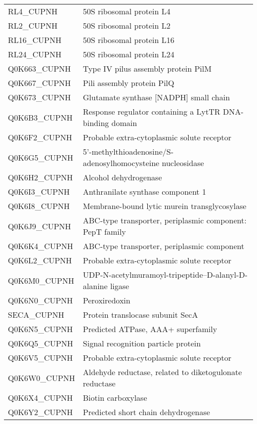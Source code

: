 \begin{center}
\begin{longtable}{ l l }
RL4\_CUPNH & 50S ribosomal protein L4 \\ [0.5ex]
RL2\_CUPNH & 50S ribosomal protein L2 \\ [0.5ex]
RL16\_CUPNH & 50S ribosomal protein L16 \\ [0.5ex]
RL24\_CUPNH & 50S ribosomal protein L24 \\ [0.5ex]
Q0K663\_CUPNH & Type IV pilus assembly protein PilM \\ [0.5ex]
Q0K667\_CUPNH & Pili assembly protein PilQ \\ [0.5ex]
Q0K673\_CUPNH & Glutamate synthase [NADPH] small chain \\ [0.5ex]
Q0K6B3\_CUPNH & Response regulator containing a LytTR DNA-binding domain \\ [0.5ex]
Q0K6F2\_CUPNH & Probable extra-cytoplasmic solute receptor \\ [0.5ex]
Q0K6G5\_CUPNH & 5'-methylthioadenosine/S-adenosylhomocysteine nucleosidase \\ [0.5ex]
Q0K6H2\_CUPNH & Alcohol dehydrogenase \\ [0.5ex]
Q0K6I3\_CUPNH & Anthranilate synthase component 1 \\ [0.5ex]
Q0K6I8\_CUPNH & Membrane-bound lytic murein transglycosylase \\ [0.5ex]
Q0K6J9\_CUPNH & ABC-type transporter, periplasmic component: PepT family \\ [0.5ex]
Q0K6K4\_CUPNH & ABC-type transporter, periplasmic component \\ [0.5ex]
Q0K6L2\_CUPNH & Probable extra-cytoplasmic solute receptor \\ [0.5ex]
Q0K6M0\_CUPNH & UDP-N-acetylmuramoyl-tripeptide--D-alanyl-D-alanine ligase \\ [0.5ex]
Q0K6N0\_CUPNH & Peroxiredoxin \\ [0.5ex]
SECA\_CUPNH & Protein translocase subunit SecA \\ [0.5ex]
Q0K6N5\_CUPNH & Predicted ATPase, AAA+ superfamily \\ [0.5ex]
Q0K6Q5\_CUPNH & Signal recognition particle protein \\ [0.5ex]
Q0K6V5\_CUPNH & Probable extra-cytoplasmic solute receptor \\ [0.5ex]
Q0K6W0\_CUPNH & Aldehyde reductase, related to diketogulonate reductase \\ [0.5ex]
Q0K6X4\_CUPNH & Biotin carboxylase \\ [0.5ex]
Q0K6Y2\_CUPNH & Predicted short chain dehydrogenase \\ [0.5ex]

\end{longtable}
\end{center}
